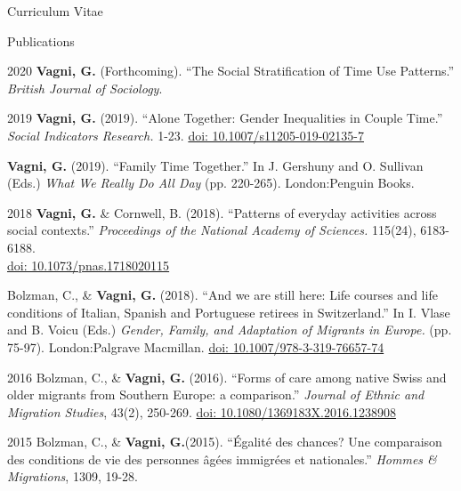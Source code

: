 \documentclass[12pt,a4paper]{article}
\begin{document}
\begin{cv}{Curriculum Vitae}
 
 \newpage
 
   \begin{cvlist}{Publications}	
   	
	\item [2020] \textbf{Vagni, G.} (Forthcoming). ``The Social Stratification of Time Use Patterns.'' \emph{British Journal of Sociology}. 
	
	 \item [2019] \textbf{Vagni, G.} (2019). ``Alone Together: Gender Inequalities in Couple Time.'' \emph{Social Indicators Research.} 1-23. \href{https://doi.org/10.1007/s11205-019-02135-7}{doi: 10.1007/s11205-019-02135-7} 
	 
		\item [] \textbf{Vagni, G.}  (2019). ``Family Time Together.'' In J. Gershuny and O. Sullivan (Eds.) \emph{What We Really Do All Day} (pp. 220-265). London:Penguin Books.  
		
		
		 \item [2018] \textbf{Vagni, G.} \& Cornwell, B. (2018). ``Patterns of everyday activities across social contexts.'' \emph{Proceedings of the National Academy of Sciences.} 115(24), 6183-6188. \\ \href{https://doi.org/10.1073/pnas.1718020115}{doi: 10.1073/pnas.1718020115} 
		 		  	
		  		    	 	 
		   \item [] Bolzman, C., \& \textbf{Vagni, G.} (2018). ``And we are still here: Life courses and life conditions of Italian, Spanish and Portuguese retirees in Switzerland.'' In I. Vlase and B. Voicu (Eds.) \emph{Gender, Family, and Adaptation of Migrants in Europe.} (pp. 75-97). London:Palgrave Macmillan. \href{https://doi.org/10.1007/978-3-319-76657-7_4}{doi: 10.1007/978-3-319-76657-74} 
  	 	    	 
   	\item [2016] Bolzman, C., \& \textbf{Vagni, G.}  (2016). ``Forms of care among native Swiss and older migrants from Southern Europe: a comparison.'' \emph{Journal of Ethnic and Migration Studies}, 43(2), 250-269. 
   	\href{https://doi.org/10.1080/1369183X.2016.1238908}{doi: 10.1080/1369183X.2016.1238908} 
   	
   	\item [2015]
   	Bolzman, C., \& \textbf{Vagni, G.}(2015). ``{\'E}galit{\'e} des chances? Une
   	comparaison des conditions de vie des personnes {\^a}g{\'e}es immigr{\'e}es
   	et nationales.'' \emph{Hommes \& Migrations}, 1309, 19-28.
   				  
   \end{cvlist}
 

\end{cv}
\end{document}

